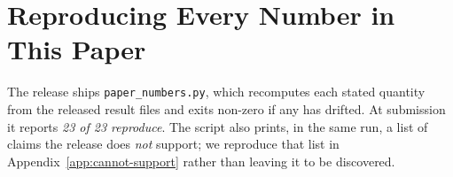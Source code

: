 %     

\appendix

\section{Reproducing Every Number in This Paper}
\label{app:repro}

The release ships \texttt{paper\_numbers.py}, which recomputes each
stated quantity from the released result files and exits non-zero if any
has drifted. At submission it reports \emph{23 of 23 reproduce}. The
script also prints, in the same run, a list of claims the release does
\emph{not} support; we reproduce that list in
Appendix~\ref{app:cannot-support} rather than leaving it to be
discovered.

